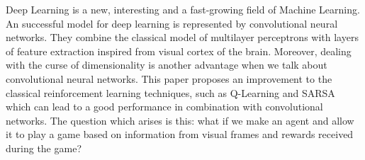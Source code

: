 
Deep Learning is a new, interesting and a fast-growing field of Machine Learning. An successful model for deep learning is represented by convolutional neural networks. They combine the classical model of multilayer perceptrons with layers of feature extraction inspired from visual cortex of the brain. Moreover, dealing with the curse of dimensionality is another advantage when we talk about convolutional neural networks. This paper proposes an improvement to the classical reinforcement learning techniques, such as Q-Learning and SARSA which can lead to a good performance in combination with convolutional networks. The question which arises is this: what if we make an agent and allow it to play a game based on information from visual frames and rewards received during the game?
